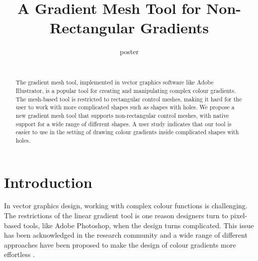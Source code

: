 \documentclass{egpubl}
\title[Non-rectangular gradient mesh tool]
{A Gradient Mesh Tool for Non-Rectangular Gradients}
\author[poster]
{\parbox{\textwidth}{\centering poster}
	\\
	{\parbox{\textwidth}{\centering } }
}
\begin{document}
	
	
	\maketitle
	
	\begin{abstract}
		The gradient mesh tool, implemented in vector graphics software like Adobe Illustrator, is a popular tool for creating and manipulating complex colour gradients. The mesh-based tool is restricted to rectangular control meshes, making it hard for the user to work with more complicated shapes such as shapes with holes. We propose a new gradient mesh tool that supports non-rectangular control meshes, with native support for a wide range of different shapes. A user study indicates that our tool is easier to use in the setting of drawing colour gradients inside complicated shapes with holes.
		
		\begin{classification} %
		\end{classification}
		
	\end{abstract}
	
	\section{Introduction}
	\label{sec:intro}
	
	In vector graphics design, working with complex colour functions is challenging. The restrictions of the linear gradient tool is one reason designers turn to pixel-based tools, like Adobe Photoshop, when the design turns complicated. This issue has been acknowledged in the research community and a wide range of different approaches have been proposed to make the design of colour gradients more effortless \cite{Orzan:2008,Lopez-Moreno:2013, Vergne:2012, Shao:2012}.
	
\end{document}
